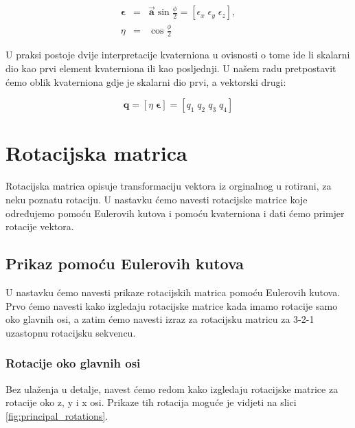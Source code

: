 \documentclass[times, utf8, diplomski, numeric]{templates/template}
\begin{document}
{{        \begin{equation}
        \label{eq:kvaternion}
        \begin{array}{rcl}
            \boldsymbol\epsilon &  = & \overrightarrow{\boldsymbol{a}}\sin\frac{\phi}{2} = \left[\epsilon_{x} \; \epsilon_{y} \; \epsilon_{z} \right], \\
            \eta & = & \cos\frac{\phi}{2}
        \end{array}
        \end{equation}

        U praksi postoje dvije interpretacije kvaterniona u ovisnosti o tome ide li skalarni dio kao prvi element kvaterniona ili kao posljednji. U našem radu pretpostavit ćemo oblik kvaterniona gdje je skalarni dio prvi, a vektorski drugi:

        \begin{equation}
        \label{eq:kvaternion_elem}
            \boldsymbol{q}=
            \left[\eta \; \boldsymbol\epsilon \right] = \left[q_{1} \; q_{2} \; q_{3} \; q_{4}\right]
        \end{equation}
    }

    \section{Rotacijska matrica}{
        Rotacijska matrica opisuje transformaciju vektora iz orginalnog u rotirani, za neku poznatu rotaciju. U nastavku ćemo navesti rotacijske matrice koje određujemo pomoću Eulerovih kutova i pomoću kvaterniona i dati ćemo primjer rotacije vektora.

        \subsection{Prikaz pomoću Eulerovih kutova}{
            U nastavku ćemo navesti prikaze rotacijskih matrica pomoću Eulerovih kutova. Prvo ćemo navesti kako izgledaju rotacijske matrice kada imamo rotacije samo oko glavnih osi, a zatim ćemo navesti izraz za rotacijsku matricu za 3-2-1 uzastopnu rotacijsku sekvencu.

            \subsubsection{Rotacije oko glavnih osi}{
                Bez ulaženja u detalje, navest ćemo redom kako izgledaju rotacijske matrice za rotacije oko z, y i x osi. Prikaze tih rotacija moguće je vidjeti na slici \ref{fig:principal_rotations}.

}}}}
\end{document}
